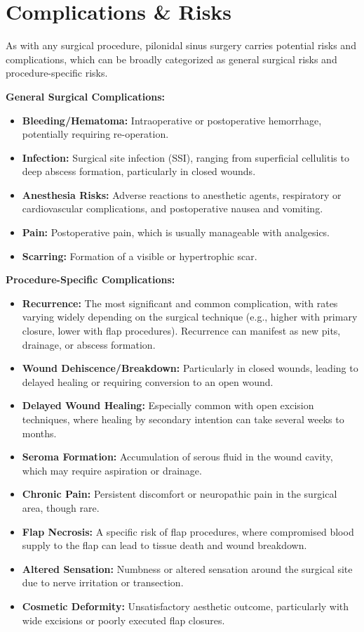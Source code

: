 \section*{Complications \& Risks}
As with any surgical procedure, pilonidal sinus surgery carries potential risks and complications, which can be broadly categorized as general surgical risks and procedure-specific risks.

\textbf{General Surgical Complications:}
\begin{itemize}
  \item \textbf{Bleeding/Hematoma:} Intraoperative or postoperative hemorrhage, potentially requiring re-operation.
  \item \textbf{Infection:} Surgical site infection (SSI), ranging from superficial cellulitis to deep abscess formation, particularly in closed wounds.
  \item \textbf{Anesthesia Risks:} Adverse reactions to anesthetic agents, respiratory or cardiovascular complications, and postoperative nausea and vomiting.
  \item \textbf{Pain:} Postoperative pain, which is usually manageable with analgesics.
  \item \textbf{Scarring:} Formation of a visible or hypertrophic scar.
\end{itemize}

\textbf{Procedure-Specific Complications:}
\begin{itemize}
  \item \textbf{Recurrence:} The most significant and common complication, with rates varying widely depending on the surgical technique (e.g., higher with primary closure, lower with flap procedures). Recurrence can manifest as new pits, drainage, or abscess formation.
  \item \textbf{Wound Dehiscence/Breakdown:} Particularly in closed wounds, leading to delayed healing or requiring conversion to an open wound.
  \item \textbf{Delayed Wound Healing:} Especially common with open excision techniques, where healing by secondary intention can take several weeks to months.
  \item \textbf{Seroma Formation:} Accumulation of serous fluid in the wound cavity, which may require aspiration or drainage.
  \item \textbf{Chronic Pain:} Persistent discomfort or neuropathic pain in the surgical area, though rare.
  \item \textbf{Flap Necrosis:} A specific risk of flap procedures, where compromised blood supply to the flap can lead to tissue death and wound breakdown.
  \item \textbf{Altered Sensation:} Numbness or altered sensation around the surgical site due to nerve irritation or transection.
  \item \textbf{Cosmetic Deformity:} Unsatisfactory aesthetic outcome, particularly with wide excisions or poorly executed flap closures.
\end{itemize}

